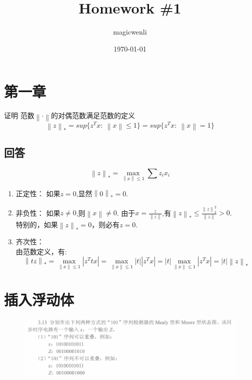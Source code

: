 \documentclass[
	12pt, %
	cn, %
]{mwhw2}
\title{Homework \#1} %
\author{magicwenli} %
\date{\today} %
\institute{Xi'an Jiao Tong University \\ Computer Science and Technology} %
\newcommand{\norm}[1]{\left\lVert#1\right\rVert}
\begin{document}
\maketitle %


\section*{第一章}

\begin{problem}{证明}
	范数$\norm{\cdot}$的对偶范数满足范数的定义
	\begin{equation*}
	    \norm{z}_*=sup\{z^Tx:\ \norm{x}\leq1\}=sup\{z^Tx:\ \norm{x}=1\}
	\end{equation*}
\end{problem}



\subsection*{回答}
    \begin{equation*}
        \norm{z}_*=\max_{\norm{x}\leq 1}\sum{z_ix_i}
    \end{equation*}
    \begin{enumerate}
    \item 正定性：
    如果$z=0$,显然$\norm{0}_*=0$.
    \item 非负性：
    如果$z\neq 0$,则$\norm{x}\neq 0$. 由于$x=\frac{z}{\norm{z}}$,有$\norm{z}_*\leq \frac{\norm{z}^2_2}{\norm{z}}>0$.\\
    特别的，如果$\norm{z}_*=0$，则必有$z=0$.
    \item 齐次性：\\
    由范数定义，有:
    \begin{equation*}
        \norm{tz}_*=\max_{\norm{x}\leq 1} | z^Ttx|=\max_{\norm{x}\leq 1}|t||z^Tx |=|t| \max_{\norm{x}\leq 1} | z^Tx |=|t|\norm{z}_*
    \end{equation*}
\end{enumerate}

\section*{插入浮动体}
\begin{figure}[htb]
	\centering
	\includegraphics[width=16cm]{src/shuDian-313}
\end{figure}
\end{document}
